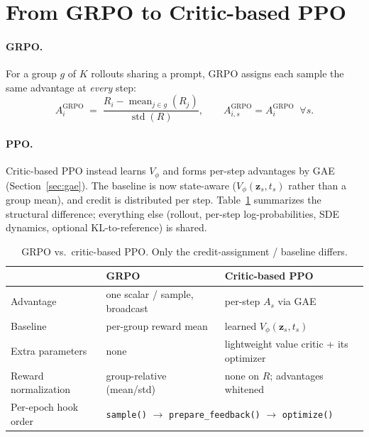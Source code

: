 \documentclass[11pt]{article}
\theoremstyle{plain}
\theoremstyle{remark}
\newcommand{\zt}{\bm{z}}
\begin{document}
\section{From GRPO to Critic-based PPO}
\label{sec:grpo-vs-ppo}

\paragraph{GRPO.}
For a group $g$ of $K$ rollouts sharing a prompt, GRPO assigns each sample the same
advantage at \emph{every} step:
\begin{equation}
A^{\mathrm{GRPO}}_i \;=\; \frac{R_i - \operatorname{mean}_{j\in g}(R_j)}{\operatorname{std}(R)},
\qquad A^{\mathrm{GRPO}}_{i,s} = A^{\mathrm{GRPO}}_i \;\; \forall s.
\end{equation}

\paragraph{PPO.}
Critic-based PPO instead learns $V_\phi$ and forms per-step advantages by GAE
(Section~\ref{sec:gae}). The baseline is now state-aware ($V_\phi(\zt_s,t_s)$ rather
than a group mean), and credit is distributed per step. Table~\ref{tab:grpo-ppo}
summarizes the structural difference; everything else (rollout, per-step
log-probabilities, SDE dynamics, optional KL-to-reference) is shared.

\begin{table}[h]
\centering
\small
\begin{tabular}{p{3.4cm} p{5.2cm} p{5.2cm}}
\toprule
 & \textbf{GRPO} & \textbf{Critic-based PPO} \\
\midrule
Advantage & one scalar / sample, broadcast & per-step $A_s$ via GAE \\
Baseline & per-group reward mean & learned $V_\phi(\zt_s, t_s)$ \\
Extra parameters & none & lightweight value critic + its optimizer \\
Reward normalization & group-relative (mean/std) & none on $R$; advantages whitened \\
Per-epoch hook order & \multicolumn{2}{l}{\texttt{sample()} $\to$ \texttt{prepare\_feedback()} $\to$ \texttt{optimize()}} \\
\bottomrule
\end{tabular}
\caption{GRPO vs.\ critic-based PPO. Only the credit-assignment / baseline differs.}
\label{tab:grpo-ppo}
\end{table}
\end{document}
